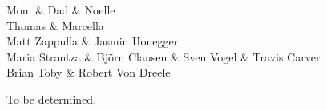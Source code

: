 \documentclass[letterpaper,12pt]{article}
\begin{document}


\listofabbreviations
\newpage



\begin{acknowledgments}

Mom \& Dad \& Noelle\\
Thomas \& Marcella \\
Matt Zappulla \& Jasmin Honegger \\
Maria Strantza \& Bj\"orn Clausen \& Sven Vogel \& Travis Carver \\
Brian Toby \& Robert Von Dreele \\

\end{acknowledgments}
\newpage

\begin{dedication}
To be determined.
\end{dedication}
\newpage

\bodymatter











\backmatter




\end{document}
